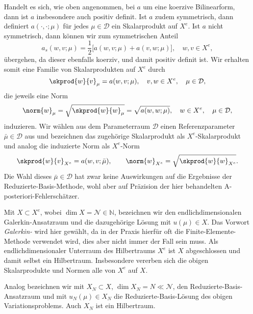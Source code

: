 Handelt es sich, wie oben angenommen, bei $a$ um eine koerzive Bilinearform, dann ist $a$ insbesondere auch positiv definit.
Ist $a$ zudem symmetrisch, dann definiert $a(\cdot, \cdot; \mu)$ für jedes $\mu \in \mathcal D$ ein Skalarprodukt auf $X^e$.
Ist $a$ nicht symmetrisch, dann können wir zum symmetrischen Anteil
\begin{equation}
    a_s(w, v; \mu) = \frac{1}{2} \Big[ a(w, v; \mu) + a(v, w; \mu) \Big], \quad w, v \in X^e,
\end{equation}
übergehen, da dieser ebenfalls koerziv, und damit positiv definit ist.
Wir erhalten somit eine Familie von Skalarprodukten auf $X^e$ durch
\begin{equation}
    \skprod{w}{v}_{\mu} = a(w, v; \mu), \quad v, w \in X^e, \quad \mu \in \mathcal D,
\end{equation}
die jeweils eine Norm
\begin{equation}
    \norm{w}_{\mu} = \sqrt{\skprod{w}{w}_{\mu}} = \sqrt{a(w, w; \mu)}, \quad w \in X^e, \quad \mu \in \mathcal D,
\end{equation}
induzieren.
Wir wählen aus dem Parameterraum $\mathcal D$ einen Referenzparameter $\bar \mu \in \mathcal D$ aus und bezeichnen das zugehörige Skalarprodukt als $X^e$-Skalarprodukt und analog die induzierte Norm als $X^e$-Norm
\begin{equation}
    \skprod{w}{v}_{X^e} = a(w, v; \bar \mu),
    \qquad
    \norm{w}_{X^e} = \sqrt{\skprod{w}{w}_{X^e}}.
\end{equation}
Die Wahl dieses $\bar \mu \in \mathcal D$ hat zwar keine Auswirkungen auf die Ergebnisse der Reduzierte-Basis-Methode, wohl aber auf Präzision der hier behandelten A-posteriori-Fehlerschätzer.

Mit $X \subset X^e$, wobei $\dim X = \mathcal N \in \mathbb{N}$, bezeichnen wir den endlichdimensionalen Galerkin-Ansatzraum und die dazugehörige Lösung mit $u(\mu) \in X$.
Das Vorwort \emph{Galerkin-} wird hier gewählt, da in der Praxis hierfür oft die Finite-Elemente-Methode verwendet wird, dies aber nicht immer der Fall sein muss.
Als endlichdimensionaler Unterraum des Hilbertraums $X^e$ ist $X$ abgeschlossen und damit selbst ein Hilbertraum.
Insbesondere vererben sich die obigen Skalarprodukte und Normen alle von $X^e$ auf $X$.

Analog bezeichnen wir mit $X_N \subset X$, $\dim X_N = N \ll \mathcal N$, den Reduzierte-Basis-Ansatzraum und mit $u_N(\mu) \in X_N$ die Reduzierte-Basis-Lösung des obigen Variationsproblems.
Auch $X_N$ ist ein Hilbertraum.

